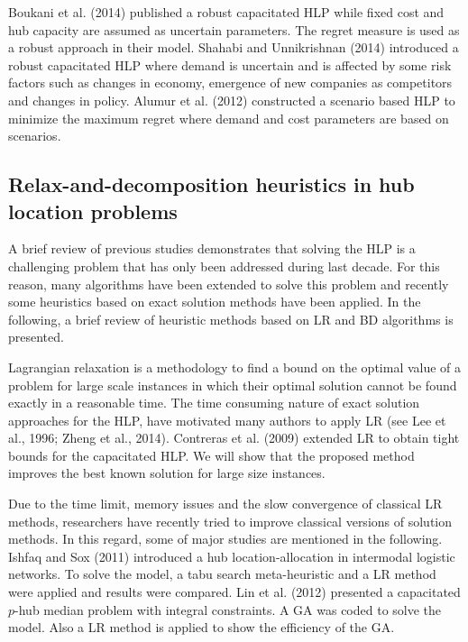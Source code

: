 \documentclass[review]{elsarticle}
\begin{document}
Boukani et al. (2014) published a robust capacitated HLP while fixed cost and hub capacity are assumed as uncertain parameters. The regret measure is used as a robust approach in their model. Shahabi and Unnikrishnan (2014) introduced a robust capacitated HLP where demand is uncertain and is affected by some risk factors such as changes in economy, emergence of new companies as competitors and changes in policy. Alumur et al. (2012) constructed a scenario based HLP to minimize the maximum regret where demand and cost parameters are based on scenarios.

\subsection{Relax-and-decomposition heuristics in hub location problems}

A brief review of previous studies demonstrates that solving the HLP is a challenging problem that has only been addressed during last decade. For this reason, many algorithms have been extended to solve this problem and recently some heuristics based on exact solution methods have been applied. In the following, a brief review of heuristic methods based on LR and BD algorithms is presented. 

Lagrangian relaxation is a methodology to find a bound on the optimal value of a problem for large scale instances in which their optimal solution cannot be found exactly in a reasonable time. The time consuming nature of exact solution approaches for the HLP, have motivated many authors to apply LR (see Lee et al., 1996; Zheng et al., 2014). Contreras et al. (2009) extended LR to obtain tight bounds for the capacitated HLP. We will show that the proposed method improves the best known solution for large size instances.

Due to the time limit, memory issues and the slow convergence of classical LR methods, researchers have recently tried to improve classical versions of solution methods. In this regard, some of major studies are mentioned in the following. Ishfaq and Sox (2011) introduced a hub location-allocation in intermodal logistic networks. To solve the model, a tabu search meta-heuristic and a LR method were applied and results were compared. Lin et al. (2012) presented a capacitated $p$-hub median problem with integral constraints. A GA was coded to solve the model. Also a LR method is applied to show the efficiency of the GA.
\end{document}
